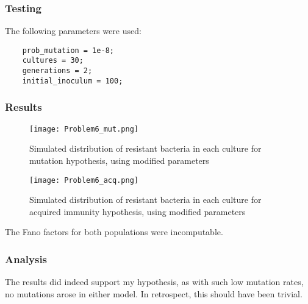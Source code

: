 \documentclass[titlepage]{scrreprt}
\begin{document}
\subsubsection{Testing}
The following parameters were used:
\begin{verbatim}
    prob_mutation = 1e-8;
    cultures = 30;
    generations = 2;
    initial_inoculum = 100;
\end{verbatim}
\subsubsection{Results}
\begin{figure}[H]
    \centering
    \texttt{[image: Problem6\_mut.png]}
    \caption{Simulated distribution of resistant bacteria in each culture for mutation hypothesis, using modified parameters}
    \label{fig:problem6_mut_histogram}
\end{figure}
\begin{figure}[H]
    \centering
    \texttt{[image: Problem6\_acq.png]}
    \caption{Simulated distribution of resistant bacteria in each culture for acquired immunity hypothesis, using modified parameters}
    \label{fig:problem6_acq_histogram}
\end{figure}
The Fano factors for both populations were incomputable.
\subsubsection{Analysis}
The results did indeed support my hypothesis, as with such low mutation rates, no mutations arose in either model.  In retrospect, this should have been trivial.
\end{document}
